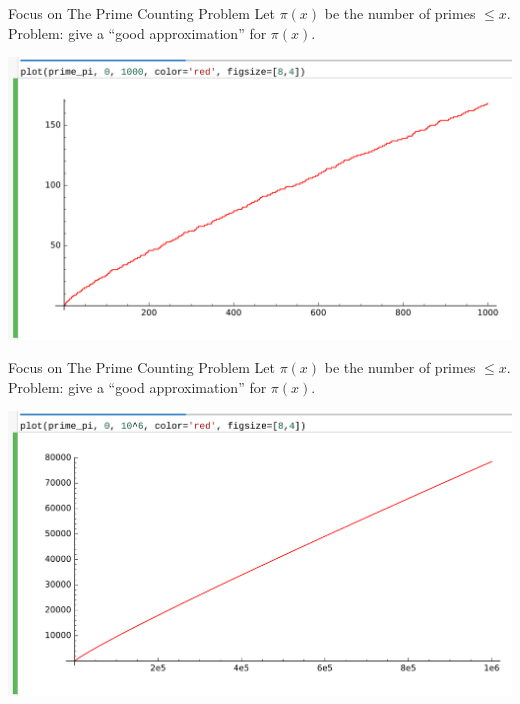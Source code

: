 \documentclass{beamer}
\begin{document}
\begin{frame}{Focus on The Prime Counting Problem}
  Let $\pi(x)$ be the number of primes $\leq x$.\\
  Problem: give a ``good approximation'' for $\pi(x)$.
  \vfill

  \includegraphics[width=.98\textwidth]{pics/prime-pi-1000}

\end{frame}

\begin{frame}{Focus on The Prime Counting Problem}
  Let $\pi(x)$ be the number of primes $\leq x$.\\
  Problem: give a ``good approximation'' for $\pi(x)$.
  \vfill

  \includegraphics[width=.98\textwidth]{pics/prime-pi-1000000}

\end{frame}
\end{document}
